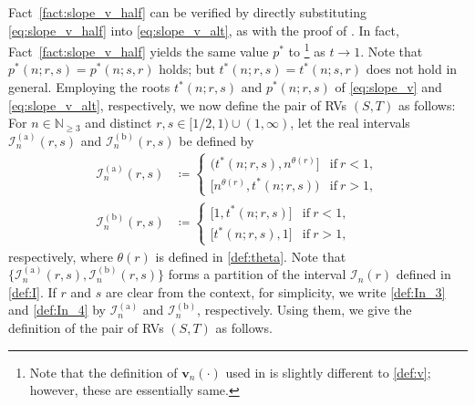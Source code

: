 \documentclass[conference, draftcls, onecolumn]{IEEEtran}
\theoremstyle{plain}
\newcommand{\bvec}[1]{\boldsymbol{#1}}
\newcommand{\factref}[1]{Fact~\ref{#1}}
\begin{document}
\factref{fact:slope_v_half} can be verified by directly substituting \eqref{eq:slope_v_half} into \eqref{eq:slope_v_alt}, as with the proof of \cite[Fact~2]{part2}.
In fact, \factref{fact:slope_v_half} yields the same value $p^{\ast}$ to%
\footnote{Note that the definition of $\bvec{v}_{n}( \cdot )$ used in \cite{part2} is slightly different to \eqref{def:v}; however, these are essentially same.}
\cite[Fact~2]{part2} as $t \to 1$.
Note that $p^{\ast}(n; r, s) = p^{\ast}(n; s, r)$ holds; but $t^{\ast}(n; r, s) = t^{\ast}(n; s, r)$ does not hold in general.
Employing the roots $t^{\ast}(n; r, s)$ and $p^{\ast}(n; r, s)$ of \eqref{eq:slope_v} and \eqref{eq:slope_v_alt}, respectively, we now define the pair of RVs $(S, T)$ as follows:
For $n \in \mathbb{N}_{\ge 3}$ and distinct $r, s \in [1/2, 1) \cup (1, \infty)$, let the real intervals $\mathcal{I}_{n}^{(\mathrm{a})}( r, s )$ and $\mathcal{I}_{n}^{(\mathrm{b})}( r, s )$ be defined by
\begin{align}
\mathcal{I}_{n}^{(\mathrm{a})}( r, s )
& \coloneqq
\begin{cases}
\big( t^{\ast}(n; r, s), n^{\theta( r )} \big]
& \mathrm{if} \ r < 1 ,
\\
\big[ n^{\theta( r )}, t^{\ast}(n; r, s) \big)
& \mathrm{if} \ r > 1 ,
\end{cases}
\label{def:In_3} \\
\mathcal{I}_{n}^{(\mathrm{b})}( r, s )
& \coloneqq
\begin{cases}
\big[ 1, t^{\ast}(n; r, s) \big]
& \mathrm{if} \ r < 1 ,
\\
\big[ t^{\ast}(n; r, s), 1 \big]
& \mathrm{if} \ r > 1 ,
\end{cases}
\label{def:In_4}
\end{align}
respectively, where $\theta( r )$ is defined in \eqref{def:theta}.
Note that $\{ \mathcal{I}_{n}^{(\mathrm{a})}( r, s ), \mathcal{I}_{n}^{(\mathrm{b})}( r, s ) \}$ forms a partition of the interval $\mathcal{I}_{n}( r )$ defined in \eqref{def:I}.
If $r$ and $s$ are clear from the context, for simplicity, we write \eqref{def:In_3} and \eqref{def:In_4} by $\mathcal{I}_{n}^{(\mathrm{a})}$ and $\mathcal{I}_{n}^{(\mathrm{b})}$, respectively.
Using them, we give the definition of the pair of RVs $(S, T)$ as follows.
\end{document}
